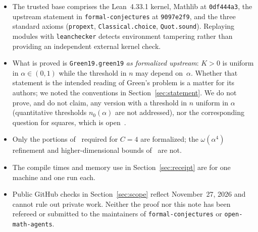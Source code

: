 \documentclass[11pt,reqno]{amsart}
\theoremstyle{remark}
\newcommand{\LeanUS}{\textunderscore\hspace{0pt}}
\newcommand{\lean}[1]{{\let\_\LeanUS\texttt{#1}}}
\begin{document}
\begin{itemize}[leftmargin=1.8em]
\item The trusted base comprises the Lean~4.33.1 kernel, Mathlib at \lean{0df444a3}, the upstream statement in \lean{formal-conjectures} at \lean{9097e2f9}, and the three standard axioms (\lean{propext}, \lean{Classical.\allowbreak{}choice}, \lean{Quot.\allowbreak{}sound}). Replaying modules with \lean{leanchecker} detects environment tampering rather than providing an independent external kernel check.
\item What is proved is \lean{Green19.\allowbreak{}green\_19} \emph{as formalized upstream}: $K > 0$ is uniform in $\alpha \in (0, 1)$ while the threshold in $n$ may depend on~$\alpha$. Whether that statement is the intended reading of Green's problem is a matter for its authors; we noted the conventions in Section~\ref{sec:statement}. We do not prove, and do not claim, any version with a threshold in $n$ uniform in $\alpha$ (quantitative thresholds $n_0(\alpha)$ are not addressed), nor the corresponding question for squares, which is open~\cite{Green,FSSSZ}.
\item Only the portions of~\cite{Mandache,FSSSZ} required for $C = 4$ are formalized; the $\omega(\alpha^4)$ refinement and higher-dimensional bounds of~\cite{FSSSZ} are not.
\item The compile times and memory use in Section~\ref{sec:receipt} are for one machine and one run each.
\item Public GitHub checks in Section~\ref{sec:scope} reflect November~27, 2026 and cannot rule out private work. Neither the proof nor this note has been refereed or submitted to the maintainers of \lean{formal-conjectures} or \lean{open-math-agents}.
\end{itemize}
\end{document}
